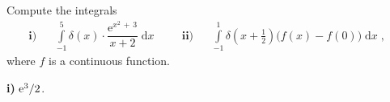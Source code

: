 {
Compute the integrals
\begin{align*}
\mathbf{i)} &  & \int\limits_{-1}^{5}\delta (x)\cdot \dfrac{\text{e}^{x^2\,+\,3}}{x+2}\;\text{d}x & \;\;\; & 
\mathbf{ii)} &  & \int\limits_{-1}^{1}\delta \left( x+\frac 12\right) \Big(f(x)-f(0)\Big)\;\text{d}x\;,\;\;
\end{align*}
where $f$ is a continuous function. 
}

{
{\bf i)} $\mathrm{e}^{3}/2$. 
}
